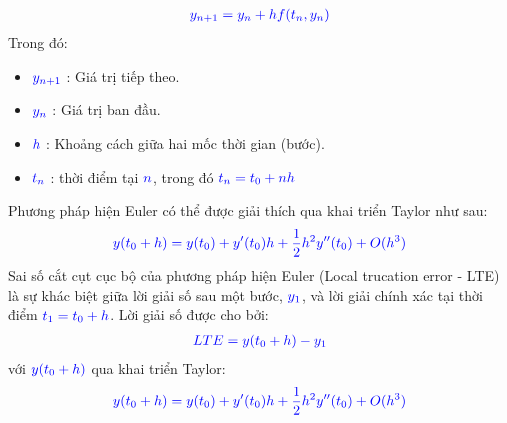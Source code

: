 \documentclass[a4paper]{article}
\begin{document}
	   \begin{align} \notag
	        \textcolor{blue}{y_{n+1} = y_{n} + hf(t_{n}, y_{n})} 
	   \end{align}
	   Trong đó:
    \begin{itemize}
        \item $\textcolor{blue}{y_{n+1}}$ : Giá trị tiếp theo.
        \item $\textcolor{blue}{y_{n}}$ : Giá trị ban đầu. 
        \item $\textcolor{blue}{h}$ : Khoảng cách giữa hai mốc thời gian (bước).
        \item $\textcolor{blue}{t_{n}}$ : thời điểm tại $\textcolor{blue}{n}$, trong đó $\textcolor{blue}{t_{n} = t_{0} + nh}$
    \end{itemize}
    Phương pháp hiện Euler có thể được giải thích qua khai triển Taylor như sau: 
    \begin{align} \notag
        \textcolor{blue}{y(t_{0} + h) = y(t_{0}) + y'(t_0)h + \dfrac{1}{2}h^{2}y''(t_{0}) + O(h^3)}
    \end{align}
    Sai số cắt cụt cục bộ của phương pháp hiện Euler (Local trucation error - LTE) là sự khác biệt giữa lời giải số sau một bước, $\textcolor{blue}{y_1}$, và lời giải chính xác tại thời điểm $\textcolor{blue}{t_1 = t_0 + h}$.
    Lời giải số được cho bởi:
    \begin{align} \notag
        \textcolor{blue}{LTE = y(t_0 + h) - y_1}
    \end{align}
    với $\textcolor{blue}{y(t_{0} + h)}$ qua khai triển Taylor: 
	\begin{align} \notag
        \textcolor{blue}{y(t_{0} + h) = y(t_{0}) + y'(t_0)h + \dfrac{1}{2}h^{2}y''(t_{0}) + O(h^3)}
    \end{align}
\end{document}
